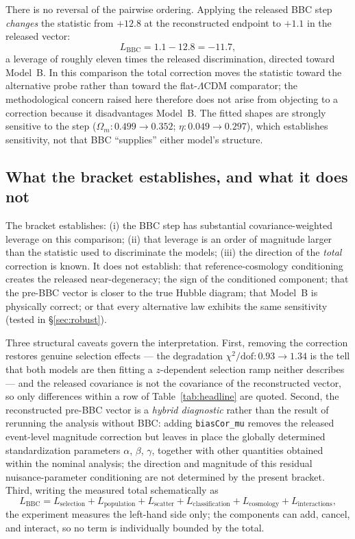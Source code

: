 \documentclass[11pt]{article}
\begin{document}
There is no reversal of the pairwise ordering. Applying the released BBC
step \emph{changes} the statistic from $+12.8$ at the reconstructed
endpoint to $+1.1$ in the released vector:
\begin{equation}
L_{\mathrm{BBC}} = 1.1 - 12.8 = -11.7 ,
\end{equation}
a leverage of roughly eleven times the released discrimination, directed
toward Model~B. In this comparison the total correction moves the
statistic toward the alternative probe rather than toward the
flat-$\Lambda$CDM comparator; the methodological concern raised here
therefore does not arise
from objecting to a correction because it disadvantages Model~B. The
fitted shapes are strongly sensitive to the step
($\Omega_m: 0.499 \rightarrow 0.352$; $\eta: 0.049 \rightarrow 0.297$),
which establishes sensitivity, not that BBC ``supplies'' either model's
structure.

\subsection{What the bracket establishes, and what it does not}
\label{sec:limits}

The bracket establishes: (i) the BBC step has substantial
covariance-weighted leverage on this comparison; (ii) that leverage is an
order of magnitude larger than the statistic used to discriminate the
models; (iii) the direction of the \emph{total} correction is known. It
does not establish: that reference-cosmology conditioning creates the
released near-degeneracy; the sign of the conditioned component; that the
pre-BBC vector is closer to the true Hubble diagram; that Model~B is
physically correct; or that every alternative law exhibits the same
sensitivity (tested in \S\ref{sec:robust}).

Three structural caveats govern the interpretation. First, removing the
correction restores genuine selection effects --- the degradation
$\chi^2/\mathrm{dof}: 0.93 \rightarrow 1.34$ is the tell that both models
are then fitting a $z$-dependent selection ramp neither describes --- and
the released covariance is not the covariance of the reconstructed vector,
so only differences within a row of Table~\ref{tab:headline} are quoted.
Second, the reconstructed pre-BBC vector is a \emph{hybrid diagnostic}
rather than the result of rerunning the analysis without BBC: adding
\texttt{biasCor\_mu} removes the released event-level magnitude correction
but leaves in place the globally determined standardization parameters
$\alpha$, $\beta$, $\gamma$, together with other quantities obtained
within the nominal analysis; the direction and magnitude of this residual
nuisance-parameter conditioning are not determined by the present bracket.
Third, writing the measured total schematically as
\begin{equation}
L_{\mathrm{BBC}} =
L_{\mathrm{selection}} + L_{\mathrm{population}} + L_{\mathrm{scatter}}
+ L_{\mathrm{classification}} + L_{\mathrm{cosmology}}
+ L_{\mathrm{interactions}} ,
\label{eq:decomp}
\end{equation}
the experiment measures the left-hand side only; the components can add,
cancel, and interact, so no term is individually bounded by the total.
\end{document}
